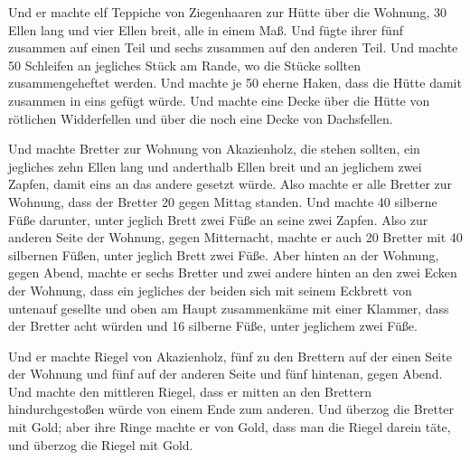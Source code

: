  Und er machte elf Teppiche von Ziegenhaaren zur Hütte über
die Wohnung,  30 Ellen lang und vier Ellen breit, alle in
einem Maß.  Und fügte ihrer fünf zusammen auf einen Teil
und sechs zusammen auf den anderen Teil.  Und machte 50
Schleifen an jegliches Stück am Rande, wo die Stücke sollten
zusammengeheftet werden.  Und machte je 50 eherne Haken,
dass die Hütte damit zusammen in eins gefügt würde.  Und
machte eine Decke über die Hütte von rötlichen Widderfellen und über die
noch eine Decke von Dachsfellen.

 Und machte Bretter zur Wohnung von Akazienholz, die stehen
sollten,  ein jegliches zehn Ellen lang und anderthalb
Ellen breit  und an jeglichem zwei Zapfen, damit eins an
das andere gesetzt würde. Also machte er alle Bretter zur Wohnung,
 dass der Bretter 20 gegen Mittag standen. 
Und machte 40 silberne Füße darunter, unter jeglich Brett zwei Füße an
seine zwei Zapfen.  Also zur anderen Seite der Wohnung,
gegen Mitternacht, machte er auch 20 Bretter  mit 40
silbernen Füßen, unter jeglich Brett zwei Füße.  Aber
hinten an der Wohnung, gegen Abend, machte er sechs Bretter
 und zwei andere hinten an den zwei Ecken der Wohnung,
 dass ein jegliches der beiden sich mit seinem Eckbrett von
untenauf gesellte und oben am Haupt zusammenkäme mit einer Klammer,
 dass der Bretter acht würden und 16 silberne Füße, unter
jeglichem zwei Füße.

 Und er machte Riegel von Akazienholz, fünf zu den Brettern
auf der einen Seite der Wohnung  und fünf auf der anderen
Seite und fünf hintenan, gegen Abend.  Und machte den
mittleren Riegel, dass er mitten an den Brettern hindurchgestoßen würde
von einem Ende zum anderen.  Und überzog die Bretter mit
Gold; aber ihre Ringe machte er von Gold, dass man die Riegel darein
täte, und überzog die Riegel mit Gold.

